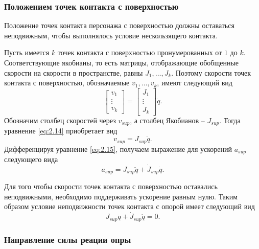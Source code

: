 \subsubsection{Положением точек контакта с поверхностью}

Положение точек контакта персонажа с поверхностью должны оставаться неподвижным, чтобы выполнялось условие нескользящего контакта.

Пусть имеется $k$ точек контакта с поверхностью пронумерованных от $1$ до $k$. Соответствующие якобианы, то есть матрицы, отображающие обобщенные скорости на скорости в пространстве, равны $J_{1}, \ldots, J_{k}$. Поэтому скорости точек контакта с поверхностью, обозначаемые $v_{1}, \ldots, v_{k}$, имеют следующий вид
\begin{equation*}
  \begin{bmatrix} v_{1} \\ \vdots \\ v_{k} \end{bmatrix} = \begin{bmatrix} J_{1} \\ \vdots \\ J_{k} \end{bmatrix} \dot{q}. \tag{2.14}\label{eq:2.14}
\end{equation*}
Обозначим столбец скоростей через $v_{sup}$, а столбец Якобианов -- $J_{sup}$. Тогда уравнение \ref{eq:2.14} приобретает вид
\begin{equation*}
  v_{sup} = J_{sup} \dot{q}. \tag{2.15}\label{eq:2.15}
\end{equation*}
Дифференцируя уравнение \ref{eq:2.15}, получаем выражение для ускорений $a_{sup}$ следующего вида
\begin{equation*}
  a_{sup} = J_{sup} \ddot{q} + \dot{J}_{sup} \dot{q}. \tag{2.16}\label{eq:2.16}
\end{equation*}

Для того чтобы скорости точек контакта с поверхностью оставались неподвижными, необходимо поддерживать ускорение равным нулю. Таким образом условие неподвижности точек контакта с опорой имеет следующий вид
\begin{equation*}
  J_{sup} \ddot{q} + \dot{J}_{sup} \dot{q} = 0. \tag{2.17}\label{eq:2.17}
\end{equation*}

\subsubsection{Направление силы реации опры}

